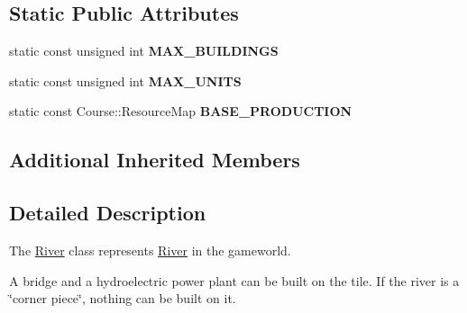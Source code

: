 \subsection*{Static Public Attributes}
\begin{DoxyCompactItemize}
\item 
\hypertarget{class_student_1_1_river_a530dcd2472ac6781b284ef55bb9a1d55}{static const unsigned int {\bfseries M\-A\-X\-\_\-\-B\-U\-I\-L\-D\-I\-N\-G\-S}}\label{class_student_1_1_river_a530dcd2472ac6781b284ef55bb9a1d55}

\item 
\hypertarget{class_student_1_1_river_a2d08e2c74dc9d98d0b2b20f36e744df5}{static const unsigned int {\bfseries M\-A\-X\-\_\-\-U\-N\-I\-T\-S}}\label{class_student_1_1_river_a2d08e2c74dc9d98d0b2b20f36e744df5}

\item 
\hypertarget{class_student_1_1_river_a51a700128a1f821f95203816f340e05b}{static const Course\-::\-Resource\-Map {\bfseries B\-A\-S\-E\-\_\-\-P\-R\-O\-D\-U\-C\-T\-I\-O\-N}}\label{class_student_1_1_river_a51a700128a1f821f95203816f340e05b}

\end{DoxyCompactItemize}
\subsection*{Additional Inherited Members}


\subsection{Detailed Description}
The \hyperlink{class_student_1_1_river}{River} class represents \hyperlink{class_student_1_1_river}{River} in the gameworld. 

A bridge and a hydroelectric power plant can be built on the tile. If the river is a \char`\"{}corner piece\char`\"{}, nothing can be built on it. 

